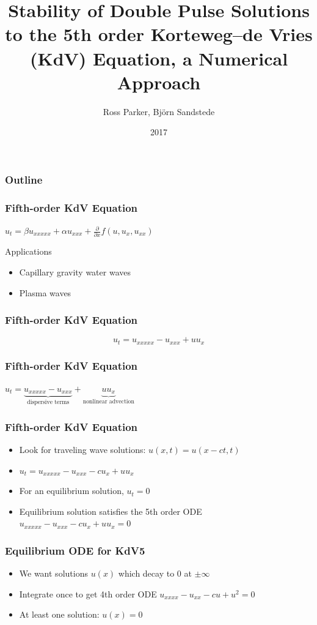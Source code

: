 \documentclass[16pt]{beamer}
\title[Stability of Double Pulses]{Stability of Double Pulse Solutions to the 5th order Korteweg–de Vries (KdV) Equation, a Numerical Approach}
\author[R. Parker]{Ross Parker, Bj\"{o}rn Sandstede}
\institute{Brown University}
\date{2017}
\begin{document}
 
\frame{\titlepage}
 
\begin{frame}
\frametitle{Outline}
\tableofcontents
\end{frame}

\begin{frame}
	\frametitle{Fifth-order KdV Equation}
	\begin{description}
		\item<1->
		$u_t = \beta u_{xxxxx} + \alpha u_{xxx} + \frac{\partial}{\partial x}f(u, u_x, u_{xx})$
		\item<2->
		Applications
		\begin{itemize}
			\item Capillary gravity water waves
			\item Plasma waves
		\end{itemize}

		\end{description}
\end{frame}

\begin{frame}
	\frametitle{Fifth-order KdV Equation }   
	\fontsize{20}{7.2}\selectfont
	\begin{center}
	\[ u_t = u_{xxxxx} - u_{xxx} + u u_x \]
	\end{center}
\end{frame}

\begin{frame}
	\frametitle{Fifth-order KdV Equation}
	$u_t = \underbrace{u_{xxxxx} - u_{xxx}}_{\text{dispersive terms}} + \underbrace{u u_x}_{\text{nonlinear advection}}$
\end{frame}

\begin{frame}
	\frametitle{Fifth-order KdV Equation}
	\begin{itemize}
		\item<1-> Look for traveling wave solutions: $u(x, t) = u(x - ct, t)$
		\item<2-> $u_t = u_{xxxxx} - u_{xxx} - c u_x + u u_x$
		\item<3-> For an equilibrium solution, $u_t = 0$
		\item<4-> Equilibrium solution satisfies the 5th order ODE $u_{xxxxx} - u_{xxx} - c u_x + u u_x = 0$
	\end{itemize}
\end{frame}

\begin{frame}
	\frametitle{Equilibrium ODE for KdV5}
	\begin{itemize}
		\item<1->We want solutions $u(x)$ which decay to 0 at $\pm \infty$
		\item<2->Integrate once to get 4th order ODE $u_{xxxx} - u_{xx} - cu + u^2 = 0$
		\item<3->At least one solution: $u(x) = 0$
	\end{itemize} 
\end{frame}
\end{document}
